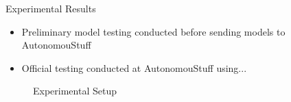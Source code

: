 \documentclass[final]{beamer}
\newlength{\sepwid}
\newlength{\onecolwid}
\begin{document}
\begin{frame}[t]
\begin{columns}[t]
\begin{column}{\onecolwid}
%
%


\end{column} %

\begin{column}{\sepwid}\end{column}

\begin{column}{\onecolwid} %


\begin{block}{Experimental Results}
\vskip -1cm
\begin{itemize}
    \item Preliminary model testing conducted before sending models to AutonomouStuff 
    \item Official testing conducted at AutonomouStuff using...
\end{itemize}
\begin{figure}
    \centering
    \caption{Experimental Setup}
    \label{fig:Setup}
\end{figure}


\end{block}
\end{column}
\end{columns}
\end{frame}
\end{document}

